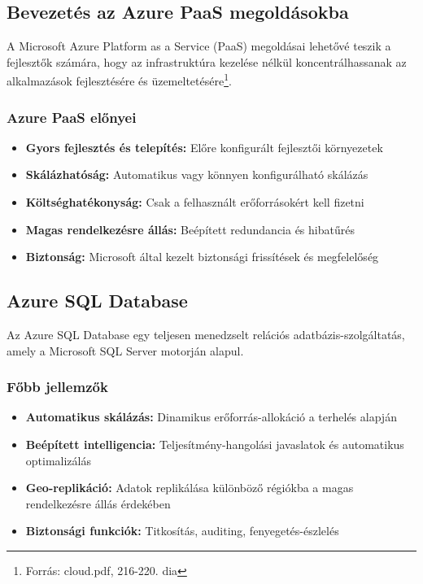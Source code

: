 \documentclass[a4paper,12pt]{article}
\begin{document}
    \subsection{Bevezetés az Azure PaaS megoldásokba}

    A Microsoft Azure Platform as a Service (PaaS) megoldásai lehetővé teszik a fejlesztők számára, hogy az infrastruktúra kezelése nélkül koncentrálhassanak az alkalmazások fejlesztésére és üzemeltetésére\footnote{Forrás: cloud.pdf, 216-220. dia}.

    \subsubsection{Azure PaaS előnyei}

    \begin{itemize}
        \item \textbf{Gyors fejlesztés és telepítés:} Előre konfigurált fejlesztői környezetek
        \item \textbf{Skálázhatóság:} Automatikus vagy könnyen konfigurálható skálázás
        \item \textbf{Költséghatékonyság:} Csak a felhasznált erőforrásokért kell fizetni
        \item \textbf{Magas rendelkezésre állás:} Beépített redundancia és hibatűrés
        \item \textbf{Biztonság:} Microsoft által kezelt biztonsági frissítések és megfelelőség
    \end{itemize}

    \subsection{Azure SQL Database}

    Az Azure SQL Database egy teljesen menedzselt relációs adatbázis-szolgáltatás, amely a Microsoft SQL Server motorján alapul.

    \subsubsection{Főbb jellemzők}

    \begin{itemize}
        \item \textbf{Automatikus skálázás:} Dinamikus erőforrás-allokáció a terhelés alapján
        \item \textbf{Beépített intelligencia:} Teljesítmény-hangolási javaslatok és automatikus optimalizálás
        \item \textbf{Geo-replikáció:} Adatok replikálása különböző régiókba a magas rendelkezésre állás érdekében
        \item \textbf{Biztonsági funkciók:} Titkosítás, auditing, fenyegetés-észlelés
    \end{itemize}
\end{document}
